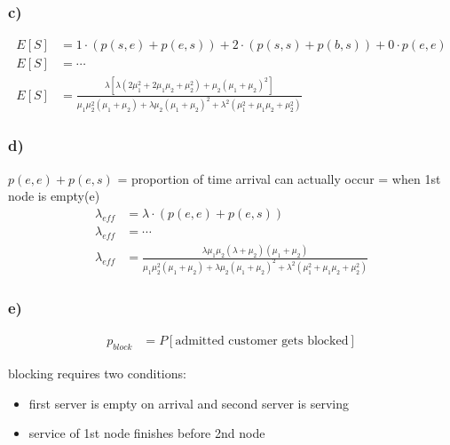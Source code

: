 \subsubsection*{c)}

\begin{align*}
E\left[S\right]&=1\cdot \left(p\left(s,e\right)+p\left(e,s\right)\right)+2\cdot \left(p\left(s,s\right)+p\left(b,s\right)\right)+0\cdot p\left(e,e\right)\\
E\left[S\right]&=\cdots\\
E [ S ] &= \frac { \lambda \left[ \lambda \left( 2 \mu _ { 1 } ^ { 2 } + 2 \mu _ { 1 } \mu _ { 2 } + \mu _ { 2 } ^ { 2 } \right) + \mu _ { 2 } \left( \mu _ { 1 } + \mu _ { 2 } \right) ^ { 2 } \right] } { \mu _ { 1 } \mu _ { 2 } ^ { 2 } \left( \mu _ { 1 } + \mu _ { 2 } \right) + \lambda \mu _ { 2 } \left( \mu _ { 1 } + \mu _ { 2 } \right) ^ { 2 } + \lambda ^ { 2 } \left( \mu _ { 1 } ^ { 2 } + \mu _ { 1 } \mu _ { 2 } + \mu _ { 2 } ^ { 2 } \right) }
\end{align*}

\subsubsection*{d)}
$p\left(e,e\right)+p\left(e,s\right)$ = proportion of time arrival can
actually occur = when 1st node is empty(e)
\begin{align*}
\lambda _{eff}&=\lambda \cdot \left(p\left(e,e\right)+p\left(e,s\right)\right)\\
\lambda _{eff}&=\cdots\\
\lambda _ {  eff } &= \frac { \lambda \mu _ { 1 } \mu _ { 2 } \left( \lambda + \mu _ { 2 } \right) \left( \mu _ { 1 } + \mu _ { 2 } \right) } { \mu _ { 1 } \mu _ { 2 } ^ { 2 } \left( \mu _ { 1 } + \mu _ { 2 } \right) + \lambda \mu _ { 2 } \left( \mu _ { 1 } + \mu _ { 2 } \right) ^ { 2 } + \lambda ^ { 2 } \left( \mu _ { 1 } ^ { 2 } + \mu _ { 1 } \mu _ { 2 } + \mu _ { 2 } ^ { 2 } \right) }
\end{align*}

\pagebreak

\subsubsection*{e)}


\begin{align*}
p_{block} &= P[\text{admitted customer gets blocked}]
\end{align*}

blocking requires two conditions: 
\begin{itemize}
\item first server is empty on arrival and second server is serving
\item service of 1st node finishes before 2nd node
\end{itemize}


